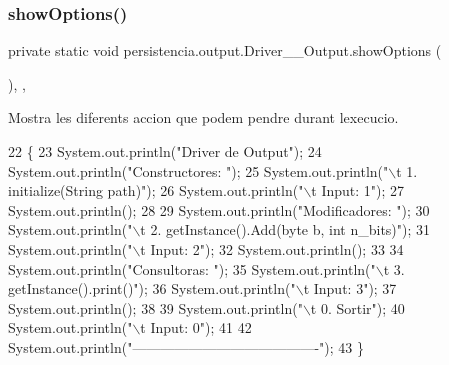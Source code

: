 \mbox{\label{classpersistencia_1_1output_1_1Driver____Output_a73ae13b88bf305d442012408333aae35}} 
\subsubsection{\texorpdfstring{show\+Options()}{showOptions()}}
{\footnotesize\ttfamily private static void persistencia.\+output.\+Driver\+\_\+\+\_\+\+Output.\+show\+Options (\begin{DoxyParamCaption}{ }\end{DoxyParamCaption})\hspace{0.3cm}{\ttfamily [inline]}, {\ttfamily [static]}, {\ttfamily [private]}}



Mostra les diferents accion que podem pendre durant l\textquotesingle{}execucio. 


\begin{DoxyCode}
22                                      \{
23         System.out.println(\textcolor{stringliteral}{"Driver de Output"});
24         System.out.println(\textcolor{stringliteral}{"Constructores: "});
25         System.out.println(\textcolor{stringliteral}{"\(\backslash\)t 1. initialize(String path)"});
26         System.out.println(\textcolor{stringliteral}{"\(\backslash\)t Input: 1"});
27         System.out.println();
28 
29         System.out.println(\textcolor{stringliteral}{"Modificadores: "});
30         System.out.println(\textcolor{stringliteral}{"\(\backslash\)t 2. getInstance().Add(byte b, int n\_bits)"});
31         System.out.println(\textcolor{stringliteral}{"\(\backslash\)t Input: 2"});
32         System.out.println();
33 
34         System.out.println(\textcolor{stringliteral}{"Consultoras: "});
35         System.out.println(\textcolor{stringliteral}{"\(\backslash\)t 3. getInstance().print()"});
36         System.out.println(\textcolor{stringliteral}{"\(\backslash\)t Input: 3"});
37         System.out.println();
38 
39         System.out.println(\textcolor{stringliteral}{"\(\backslash\)t 0. Sortir"});
40         System.out.println(\textcolor{stringliteral}{"\(\backslash\)t Input: 0"});
41 
42         System.out.println(\textcolor{stringliteral}{"----------------------------------------"});
43     \}
\end{DoxyCode}


